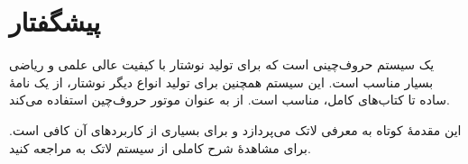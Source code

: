 


\chapter{پیشگفتار}

\lr{\LaTeX{}} \cite{manual}
یک سیستم حروف‌چینی است که برای تولید نوشتار‌‌ با کیفیت عالی علمی و ریاضی بسیار مناسب است. این سیستم همچنین برای تولید انواع دیگر نوشتار‌‌، از یک نامهٔ ساده تا کتاب‌های کامل، مناسب است. 
\lr{\LaTeX}
از 
\lr{\TeX} \cite{texbook}
به عنوان موتور حروف‌چین استفاده می‌کند.

این مقدمهٔ کوتاه به معرفی لاتک می‌پردازد و برای بسیاری از کاربردهای آن کافی است. برای مشاهدهٔ شرح کاملی از سیستم لاتک به 
\cite{manual,companion}
مراجعه کنید.


